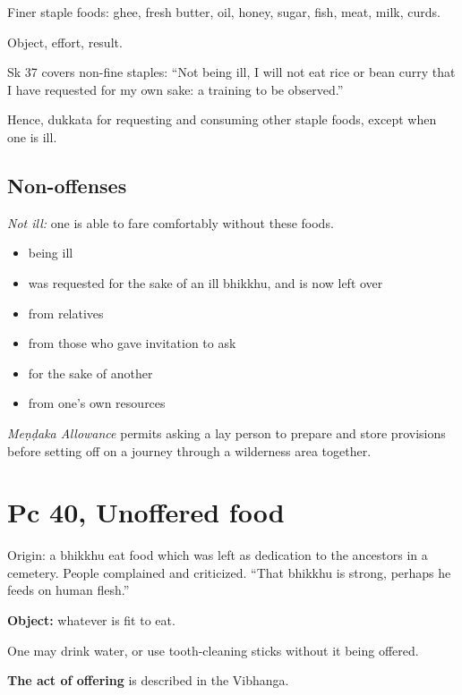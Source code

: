 Finer staple foods: ghee, fresh butter, oil, honey, sugar, fish, meat,
milk, curds.

Object, effort, result.

Sk 37 covers non-fine staples: ``Not being ill, I will not eat rice or
bean curry that I have requested for my own sake: a training to be
observed.''

Hence, dukkata for requesting and consuming other staple foods, except
when one is ill.

\subsection{Non-offenses}

\emph{Not ill:} one is able to fare comfortably without these foods.

\begin{multicols}{2}

\begin{itemize}
\tightlist
\item
  being ill
\item
  was requested for the sake of an ill bhikkhu, and is now left over
\item
  from relatives
\item
  from those who gave invitation to ask
\item
  for the sake of another
\item
  from one's own resources
\end{itemize}

\end{multicols}

\emph{Meṇḍaka Allowance} permits asking a lay person to prepare and
store provisions before setting off on a journey through a wilderness
area together.

\section{Pc 40, Unoffered food}

Origin: a bhikkhu eat food which was left as dedication to the ancestors
in a cemetery. People complained and criticized. ``That bhikkhu is
strong, perhaps he feeds on human flesh.''

\textbf{Object:} whatever is fit to eat.

One may drink water, or use tooth-cleaning sticks without it being
offered.

\textbf{The act of offering} is described in the Vibhanga.

